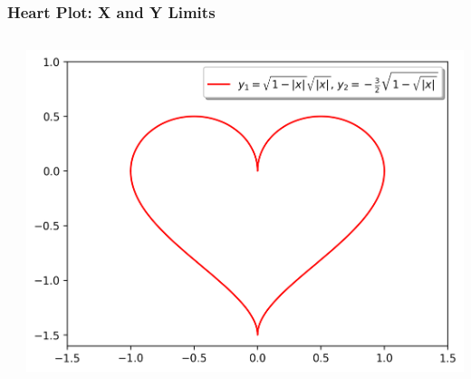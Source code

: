\documentclass[xcolor={svgnames}]{beamer}
\newcommand{\pyfile}[2][]{}
\begin{document}
\begin{frame}[t,fragile]
    \frametitle{Heart Plot: X and Y Limits}
    \vspace{-2mm}
    \begin{columns}[T]
        \begin{column}{0.47\textwidth}
            \pyfile[style=tiny,linerange={1-22}]{examples/heart-1.py}
        \end{column}
        \begin{column}{0.53\textwidth}
            \includegraphics[width=\textwidth]{img/heart-1.png}
        \end{column}
    \end{columns}
\end{frame}
\end{document}

